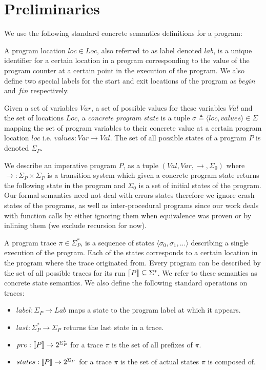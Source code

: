 \section{Preliminaries} 
We use the following standard concrete semantics definitions for a program:

A program location $loc \in Loc$, also referred to as label denoted $lab$, is a unique identifier for a certain location in a program corresponding to the value of the program counter at a certain point in the execution of the program. We also define two special labels for the start and exit locations of the program as $begin$ and $fin$ respectively.

Given a set of variables $Var$, a set of possible values for these variables $Val$ and the set of locations $Loc$, a \emph{concrete program state} is a tuple $\sigma \triangleq \langle loc, values \rangle \in \Sigma$ mapping the set of program variables to their concrete value at a certain program location $loc$ i.e. $values : Var \rightarrow Val$. The set of all possible states of a program $P$ is denoted $\Sigma_{P}$.

\begin{sloppypar}
We describe an imperative program $P$, as a tuple $(Val,Var,\rightarrow,\Sigma_{0})$ where $\rightarrow : \Sigma_{P} \times \Sigma_{P} $  is a transition system which given a concrete program state returns the following state in the program and $\Sigma_{0}$ is a set of initial states of the program. Our formal semantics need not deal with errors states therefore we ignore crash states of the programs, as well as inter-procedural programs since our work deals with function calls by either ignoring them when equivalence was proven or by inlining them (we exclude recursion for now).
\end{sloppypar}

A program trace $\pi \in \Sigma^*_{P}$, is a sequence of states $\langle \sigma_0,\sigma_1,... \rangle$ describing a single execution of the program. Each of the states corresponds to a certain location in the program where the trace originated from. Every program can be described by the set of all possible traces for its run $\lbrack\!\lbrack P \rbrack\!\rbrack \subseteq \Sigma^*$. We refer to these semantics as concrete state semantics. We also define the following standard operations on traces:
\begin{itemize}
\item $label : \Sigma_{P} \rightarrow Lab$ maps a state to the program label at which it appears.
\item $last : \Sigma_{P}^* \rightarrow \Sigma_{P}$ returns the last state in a trace.
\item $pre : \lbrack\!\lbrack P \rbrack\!\rbrack \rightarrow 2^{\Sigma_{P}^*}$ for a trace $\pi$ is the set of all prefixes of $\pi$.
\item $states : \lbrack\!\lbrack P \rbrack\!\rbrack \rightarrow 2^{\Sigma_{P}}$ for a trace $\pi$ is the set of actual states $\pi$ is composed of.
\end{itemize}


